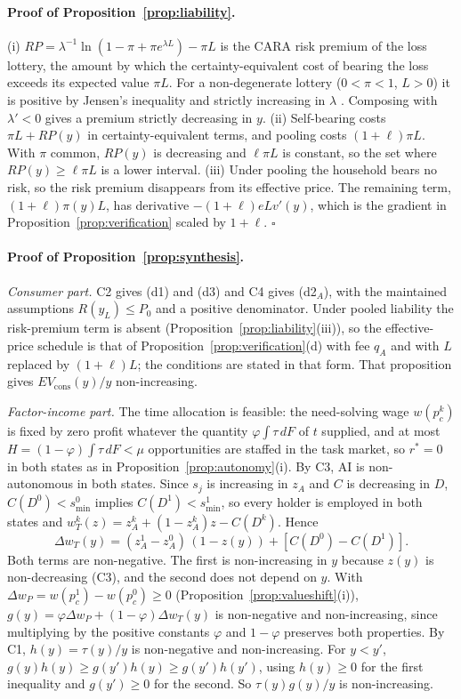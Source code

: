 \documentclass[12pt]{article}
\theoremstyle{remark}
\begin{document}
\paragraph{Proof of Proposition~\ref{prop:liability}.} (i) $RP=\lambda^{-1}\ln(1-\pi+\pi e^{\lambda L})-\pi L$ is the CARA risk premium of the loss lottery, the amount by which the certainty-equivalent cost of bearing the loss exceeds its expected value $\pi L$. For a non-degenerate lottery ($0<\pi<1$, $L>0$) it is positive by Jensen's inequality and strictly increasing in $\lambda$ \citep{pratt1964risk}. Composing with $\lambda'<0$ gives a premium strictly decreasing in $y$. (ii) Self-bearing costs $\pi L+RP(y)$ in certainty-equivalent terms, and pooling costs $(1+\ell)\pi L$. With $\pi$ common, $RP(y)$ is decreasing and $\ell\pi L$ is constant, so the set where $RP(y)\ge\ell\pi L$ is a lower interval. (iii) Under pooling the household bears no risk, so the risk premium disappears from its effective price. The remaining term, $(1+\ell)\pi(y)L$, has derivative $-(1+\ell)eLv'(y)$, which is the gradient in Proposition~\ref{prop:verification} scaled by $1+\ell$. $\square$

\paragraph{Proof of Proposition~\ref{prop:synthesis}.} \emph{Consumer part.} C2 gives (d1) and (d3) and C4 gives (d2$_A$), with the maintained assumptions $R(y_L)\le P_0$ and a positive denominator. Under pooled liability the risk-premium term is absent (Proposition~\ref{prop:liability}(iii)), so the effective-price schedule is that of Proposition~\ref{prop:verification}(d) with fee $q_A$ and with $L$ replaced by $(1+\ell)L$; the conditions are stated in that form. That proposition gives $EV_{\text{cons}}(y)/y$ non-increasing.

\emph{Factor-income part.} The time allocation is feasible: the need-solving wage $w(p_c^k)$ is fixed by zero profit whatever the quantity $\varphi\int\tau\,dF$ of $t$ supplied, and at most $H=(1-\varphi)\int\tau\,dF<\mu$ opportunities are staffed in the task market, so $r^*=0$ in both states as in Proposition~\ref{prop:autonomy}(i). By C3, AI is non-autonomous in both states. Since $s_j$ is increasing in $z_A$ and $C$ is decreasing in $D$, $C(D^0)<s^0_{\min}$ implies $C(D^1)<s^1_{\min}$, so every holder is employed in both states and $w_T^k(z)=z_A^k+(1-z_A^k)z-C(D^k)$. Hence
\[
\Delta w_T(y)=(z_A^1-z_A^0)\,(1-z(y))+[C(D^0)-C(D^1)].
\]
Both terms are non-negative. The first is non-increasing in $y$ because $z(y)$ is non-decreasing (C3), and the second does not depend on $y$. With $\Delta w_P=w(p_c^1)-w(p_c^0)\ge0$ (Proposition~\ref{prop:valueshift}(i)), $g(y)=\varphi\Delta w_P+(1-\varphi)\Delta w_T(y)$ is non-negative and non-increasing, since multiplying by the positive constants $\varphi$ and $1-\varphi$ preserves both properties. By C1, $h(y)=\tau(y)/y$ is non-negative and non-increasing. For $y<y'$, $g(y)h(y)\ge g(y')h(y)\ge g(y')h(y')$, using $h(y)\ge0$ for the first inequality and $g(y')\ge0$ for the second. So $\tau(y)g(y)/y$ is non-increasing.
\end{document}
